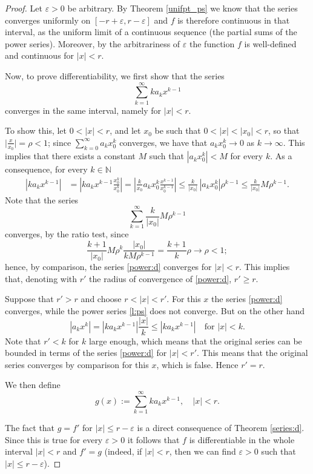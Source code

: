\documentclass[a4paper,reqno]{amsart}
\numberwithin{equation}{section}
\def\N{\mathbb{N}}
\begin{document}
\begin{proof}
Let $\varepsilon>0$ be arbitrary. By Theorem \ref{unifpt_ps} we know that the series converges uniformly on $[-r+\varepsilon,r-\varepsilon]$ and $f$ is therefore continuous in that interval, as the
uniform limit of a continuous sequence (the partial sums of the power series). Moreover, by the arbitrariness of $\varepsilon$ the function $f$ is well-defined and continuous for $|x|<r$.

Now, to prove differentiability, we first show that the series
\begin{equation}\label{power:d}
\sum_{k=1}^\infty k a_k x^{k-1}
\end{equation}
converges in the same interval, namely for $|x|<r$.

To show this, let $0<|x|<r$, and let $x_0$ be such that $0<|x|<|x_0|<r$, so that $\big|\frac{x}{x_0}\big|=\rho<1$; since $\sum_{k=0}^\infty a_k x_0^k$ converges, we have that
$a_k x_0^k\to 0$ as $k\to \infty$. This implies that there exists a constant $M$ such that $|a_kx_0^k|<M$ for every $k$. As a consequence, for every $k\in \N$
\begin{align*}
|k a_k x^{k-1}| & = \left| k a_k x^{k-1} \frac{x_0^k}{x_0^k}\right| = \left|\frac{k}{x_0} a_k x_0^k \frac{x^{k-1}}{x_0^{k-1}}\right|\leq \frac{k}{|x_0|}\, |a_kx_0^k| \rho^{k-1} \leq \frac{k}{|x_0|} M \rho^{k-1}.
\end{align*}
Note that the series
$$
\sum_{k=1}^\infty \frac{k}{|x_0|} M \rho^{k-1}
$$
converges, by the ratio test, since
$$
\frac{k+1}{|x_0|} M \rho^{k} \frac{|x_0| }{k M \rho^{k-1}} = \frac{k+1}{k} \rho \to \rho <1;
$$
hence, by comparison, the series \eqref{power:d} converges for $|x|<r$. This implies that, denoting with $r'$ the radius of convergence of \eqref{power:d}, $r'\geq r$.

Suppose that $r'>r$ and choose $r<|x|<r'$. For this $x$ the series \eqref{power:d} converges, while the power series \eqref{l:ps} does not converge. But on the other hand
$$
|a_k x^k| = |k a_k x^{k-1}| \frac{|x|}k \leq |k a_k x^{k-1}| \quad \textrm{for } |x|<k.
$$
Note that $r'<k$ for $k$ large enough, which means that the original series can be bounded in terms of the series  \eqref{power:d} for $|x|<r'$.
This means that the original series converges by comparison for this $x$, which is false. Hence $r'=r$.
\medskip

We then define
$$
g(x):= \sum_{k=1}^\infty k a_k x^{k-1}, \quad |x|<r.
$$

The fact that $g = f'$ for $|x|\leq r-\varepsilon$ is a direct consequence of Theorem \ref{series:d}. Since this is true for every $\varepsilon>0$ it follows that $f$ is differentiable in the whole interval $|x|<r$ and $f'=g$ (indeed, if $|x|<r$, then we
can find $\varepsilon>0$ such that $|x|\leq r-\varepsilon$). %
\end{proof}
\end{document}
